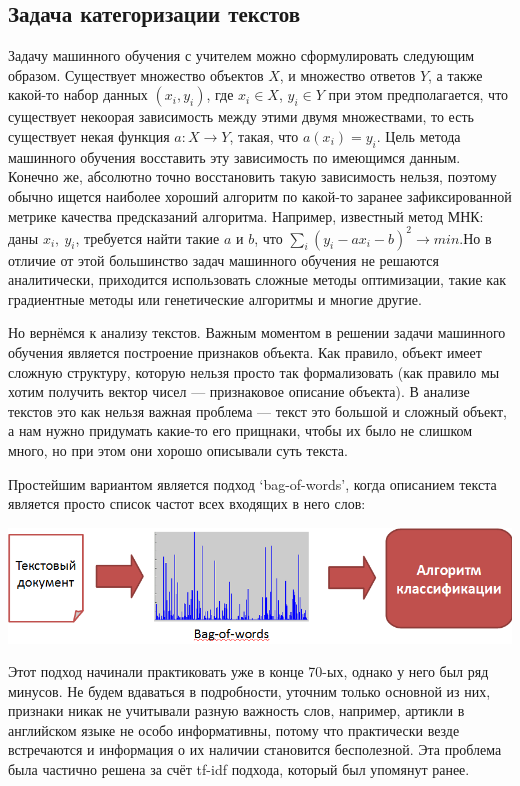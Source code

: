 \documentclass[a4paper,14pt]{extarticle}
\begin{document}
\subsection{Задача категоризации текстов}
Задачу машинного обучения с учителем можно сформулировать следующим образом. Существует множество объектов $X$, и множество ответов $Y$, а также какой-то набор данных $(x_i, y_i)$, где $x_i \in X$, $y_i \in Y$ при этом предполагается, что существует некоорая зависимость между этими двумя множествами, то есть существует некая функция $a \colon X \to Y$, такая, что $a(x_i) = y_i$. Цель метода машинного обучения восставить эту зависимость по имеющимся данным. Конечно же, абсолютно точно восстановить такую зависимость нельзя, поэтому обычно ищется наиболее хороший алгоритм по какой-то заранее зафиксированной метрике качества предсказаний алгоритма. Например, известный метод МНК: даны $x_i,~y_i$, требуется найти такие $a$ и $b$, что $\sum_i (y_i - a x_i - b)^2 \to min$.Но в отличие от этой  большинство задач машинного обучения не решаются аналитически, приходится использовать сложные методы оптимизации, такие как градиентные методы или генетические алгоритмы и многие другие.

Но вернёмся к анализу текстов. Важным моментом в решении задачи машинного обучения является построение признаков объекта. Как правило, объект имеет сложную структуру, которую нельзя просто так формализовать (как правило мы хотим получить вектор чисел --- признаковое описание объекта). В анализе текстов это как нельзя важная проблема --- текст это большой и сложный объект, а нам нужно придумать какие-то его прищнаки, чтобы их было не слишком много, но при этом они хорошо описывали суть текста.

Простейшим вариантом является подход `bag-of-words', когда описанием текста является просто список частот всех входящих в него слов:
 
\includegraphics[width=1.0\linewidth]{bag_of_words.png}

Этот подход начинали практиковать уже в конце 70-ых, однако у него был ряд минусов. Не будем вдаваться в подробности, уточним только основной из них, признаки никак не учитывали разную важность слов, например, артикли в английском языке не особо информативны, потому что практически везде встречаются и информация о их наличии становится бесполезной. Эта проблема была частично решена за счёт tf-idf подхода, который был упомянут ранее.
\end{document}
